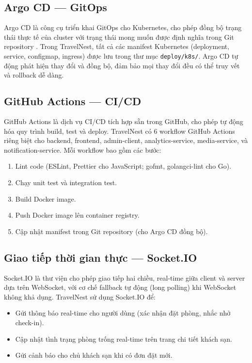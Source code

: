 \documentclass[13pt,a4paper,twoside]{report}
\begin{document}
\subsection{Argo CD --- GitOps}

Argo CD là công cụ triển khai GitOps cho Kubernetes, cho phép đồng bộ trạng thái thực tế của cluster với trạng thái mong muốn được định nghĩa trong Git repository \cite{argocd2024docs}. Trong TravelNest, tất cả các manifest Kubernetes (deployment, service, configmap, ingress) được lưu trong thư mục \texttt{deploy/k8s/}. Argo CD tự động phát hiện thay đổi và đồng bộ, đảm bảo mọi thay đổi đều có thể truy vết và rollback dễ dàng.

\subsection{GitHub Actions --- CI/CD}

GitHub Actions là dịch vụ CI/CD tích hợp sẵn trong GitHub, cho phép tự động hóa quy trình build, test và deploy. TravelNest có 6 workflow GitHub Actions riêng biệt cho backend, frontend, admin-client, analytics-service, media-service, và notification-service. Mỗi workflow bao gồm các bước:

\begin{enumerate}
  \item Lint code (ESLint, Prettier cho JavaScript; gofmt, golangci-lint cho Go).
  \item Chạy unit test và integration test.
  \item Build Docker image.
  \item Push Docker image lên container registry.
  \item Cập nhật manifest trong Git repository (cho Argo CD đồng bộ).
\end{enumerate}

\subsection{Giao tiếp thời gian thực --- Socket.IO}

Socket.IO là thư viện cho phép giao tiếp hai chiều, real-time giữa client và server dựa trên WebSocket, với cơ chế fallback tự động (long polling) khi WebSocket không khả dụng. TravelNest sử dụng Socket.IO để:

\begin{itemize}
  \item Gửi thông báo real-time cho người dùng (xác nhận đặt phòng, nhắc nhở check-in).
  \item Cập nhật tình trạng phòng trống real-time trên trang chi tiết khách sạn.
  \item Gửi cảnh báo cho chủ khách sạn khi có đơn đặt mới.
\end{itemize}
\end{document}
